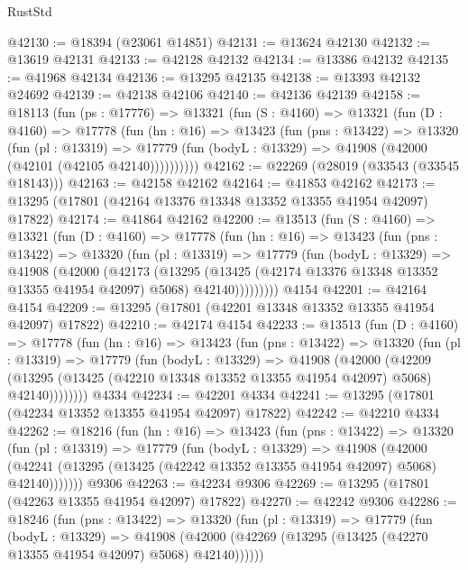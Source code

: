 \begin{lexlean}{RustStd}
\begin{coremodule}
@42130 := @18394 (@23061 @14851)
@42131 := @13624 @42130
@42132 := @13619 @42131
@42133 := @42128 @42132
@42134 := @13386 @42132
@42135 := @41968 @42134
@42136 := @13295 @42135
@42138 := @13393 @42132 @24692
@42139 := @42138 @42106
@42140 := @42136 @42139
@42158 := @18113
    (fun (ps : @17776) =>
    @13321
      (fun (S : @4160) =>
      @13321
        (fun (D : @4160) =>
        @17778
          (fun (hn : @16) =>
          @13423
            (fun (pns : @13422) =>
            @13320
              (fun (pl : @13319) =>
              @17779 (fun (bodyL : @13329) => @41908 (@42000 (@42101 (@42105 @42140))))))))))
@42162 := @22269 (@28019 (@33543 (@33545 @18143)))
@42163 := @42158 @42162
@42164 := @41853 @42162
@42173 := @13295 (@17801 (@42164 @13376 @13348 @13352 @13355 @41954 @42097) @17822)
@42174 := @41864 @42162
@42200 := @13513
    (fun (S : @4160) =>
    @13321
      (fun (D : @4160) =>
      @17778
        (fun (hn : @16) =>
        @13423
          (fun (pns : @13422) =>
          @13320
            (fun (pl : @13319) =>
            @17779
              (fun (bodyL : @13329) =>
              @41908
                (@42000
                  (@42173
                    (@13295
                      (@13425 (@42174 @13376 @13348 @13352 @13355 @41954 @42097) @5068)
                      @42140)))))))))
    @4154
@42201 := @42164 @4154
@42209 := @13295 (@17801 (@42201 @13348 @13352 @13355 @41954 @42097) @17822)
@42210 := @42174 @4154
@42233 := @13513
    (fun (D : @4160) =>
    @17778
      (fun (hn : @16) =>
      @13423
        (fun (pns : @13422) =>
        @13320
          (fun (pl : @13319) =>
          @17779
            (fun (bodyL : @13329) =>
            @41908
              (@42000
                (@42209
                  (@13295 (@13425 (@42210 @13348 @13352 @13355 @41954 @42097) @5068) @42140))))))))
    @4334
@42234 := @42201 @4334
@42241 := @13295 (@17801 (@42234 @13352 @13355 @41954 @42097) @17822)
@42242 := @42210 @4334
@42262 := @18216
    (fun (hn : @16) =>
    @13423
      (fun (pns : @13422) =>
      @13320
        (fun (pl : @13319) =>
        @17779
          (fun (bodyL : @13329) =>
          @41908
            (@42000
              (@42241 (@13295 (@13425 (@42242 @13352 @13355 @41954 @42097) @5068) @42140)))))))
    @9306
@42263 := @42234 @9306
@42269 := @13295 (@17801 (@42263 @13355 @41954 @42097) @17822)
@42270 := @42242 @9306
@42286 := @18246
    (fun (pns : @13422) =>
    @13320
      (fun (pl : @13319) =>
      @17779
        (fun (bodyL : @13329) =>
        @41908 (@42000 (@42269 (@13295 (@13425 (@42270 @13355 @41954 @42097) @5068) @42140))))))

\end{coremodule}
\end{lexlean}
